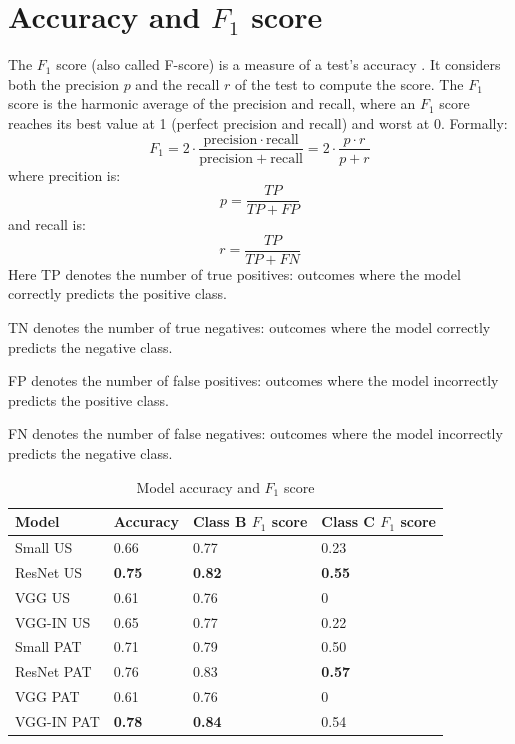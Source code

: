 \section{Accuracy and $F_1$ score}
\label{result_acc}

The $F_1$ score (also called F-score) is a measure of a test's accuracy \citep{powers2011evaluation}. It considers both the precision $p$ and the recall $r$ of the test to compute the score. The $F_1$ score is the harmonic average of the precision and recall, where an $F_1$ score reaches its best value at 1 (perfect precision and recall) and worst at 0.
Formally: 
\begin{equation}\label{f1_score}
    F_1 = 2 \cdot \frac{\mathrm{precision} \cdot \mathrm{recall}}{\mathrm{precision} + \mathrm{recall}} = 2 \cdot \frac{p \cdot r}{p+r}
\end{equation}
where precition is: $$p = \frac{TP}{TP + FP}$$
and recall is: $$r = \frac{TP}{TP + FN}$$
\noindent Here TP denotes the number of true positives: outcomes where the model correctly predicts the positive class.

\noindent TN denotes the number of true negatives: outcomes where the model correctly predicts the negative class.

\noindent FP denotes the number of false positives: outcomes where the model incorrectly predicts the positive class.

\noindent FN denotes the number of false negatives: outcomes where the model incorrectly predicts the negative class.

\begin{table}[h]
\centering
\begin{tabular}{ |p{4cm}||p{3cm}|p{3cm}|p{3cm}|  }
 \hline
 Model       & Accuracy & Class B $F_1$ score & Class C $F_1$ score\\
 \hline
 \hline
 Small  US   & 0.66  & 0.77 &  0.23\\
 ResNet US   & \textbf{0.75}  & \textbf{0.82} &  \textbf{0.55}\\
 VGG US      & 0.61  & 0.76 &  0\\
 VGG-IN US & 0.65 & 0.77 & 0.22 \\
\hline
 Small PAT   & 0.71  & 0.79 &  0.50\\
 ResNet PAT  & 0.76  & 0.83 &  \textbf{0.57}\\
 VGG PAT     & 0.61  & 0.76 &  0\\
 VGG-IN PAT & \textbf{0.78} & \textbf{0.84} & 0.54 \\
 \hline
\end{tabular}
\caption{Model accuracy and $F_1$ score}
\label{acctable}
\end{table}

